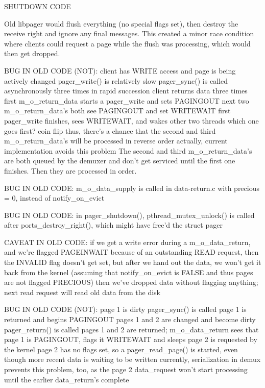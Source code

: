 \documentclass{article}
\begin{document}
SHUTDOWN CODE

Old libpager would flush everything (no special flags set), then
destroy the receive right and ignore any final messages.  This created
a minor race condition where clients could request a page while the
flush was processing, which would then get dropped.


BUG IN OLD CODE (NOT):
  client has WRITE access and page is being actively changed
  pager_write() is relatively slow
  pager_sync() is called asynchronously three times in rapid succession
  client returns data three times
  first m_o_return_data starts a pager_write and sets PAGINGOUT
  next two m_o_return_data's both see PAGINGOUT and set WRITEWAIT
  first pager_write finishes, sees WRITEWAIT, and wakes other two threads
  which one goes first?  coin flip
  thus, there's a chance that the second and third m_o_return_data's will be processed in reverse order
  actually, current implementation avoids this problem
    The second and third m_o_return_data's are both queued by the demuxer and don't
    get serviced until the first one finishes.  Then they are processed in order.

BUG IN OLD CODE:
  m_o_data_supply is called in data-return.c with precious = 0, instead of notify_on_evict

BUG IN OLD CODE:
  in pager_shutdown(), pthread_mutex_unlock() is called after ports_destroy_right(), which
  might have free'd the struct pager

CAVEAT IN OLD CODE:
  if we get a write error during a m_o_data_return, and we're flagged PAGEINWAIT because of an outstanding READ request,
  then the INVALID flag doesn't get set, but after we hand out the data, we won't get it back from the kernel
  (assuming that notify_on_evict is FALSE and thus pages are not flagged PRECIOUS)
  then we've dropped data without flagging anything; next read request will read old data from the disk

BUG IN OLD CODE (NOT):
  page 1 is dirty
  pager_sync() is called
  page 1 is returned and begins PAGINGOUT
  pages 1 and 2 are changed and become dirty
  pager_return() is called
  pages 1 and 2 are returned; m_o_data_return sees that page 1 is PAGINGOUT, flags it WRITEWAIT and sleeps
  page 2 is requested by the kernel
  page 2 has no flags set, so a pager_read_page() is started, even though more recent data is waiting to be written
  currently, serialization in demux prevents this problem, too, as the page 2 data_request won't start
    processing until the earlier data_return's complete
\end{document}
